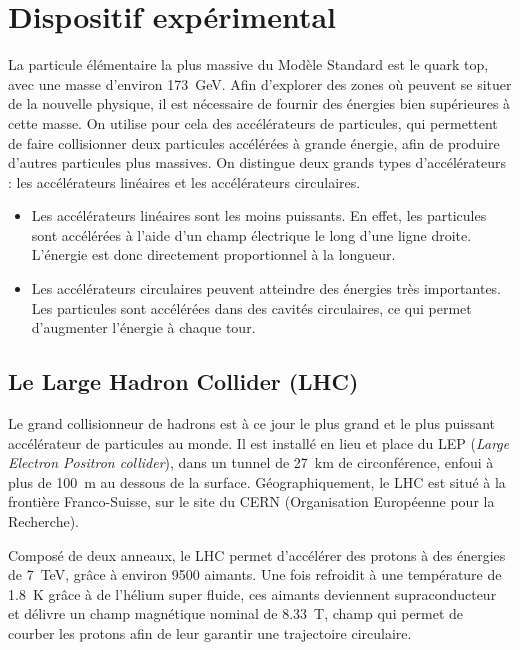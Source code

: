\chapter{Dispositif expérimental} \label{chap:detecteur}


La particule élémentaire la plus massive du Modèle Standard est le quark top, avec une masse d'environ \SI{173}{\GeV}. Afin d'explorer des zones où peuvent se situer de la nouvelle physique, il est nécessaire de fournir des énergies bien supérieures à cette masse. On utilise pour cela des accélérateurs de particules, qui permettent de faire collisionner deux particules accélérées à grande énergie, afin de produire d'autres particules plus massives. On distingue deux grands types d'accélérateurs : les accélérateurs linéaires et les accélérateurs circulaires.
\begin{itemize}
  \item Les accélérateurs linéaires sont les moins puissants. En effet, les particules sont accélérées à l'aide d'un champ électrique le long d'une ligne droite. L'énergie est donc directement proportionnel à la longueur.
  \item Les accélérateurs circulaires peuvent atteindre des énergies très importantes. Les particules sont accélérées dans des cavités circulaires, ce qui permet d'augmenter l'énergie à chaque tour. 
\end{itemize}

\section{Le Large Hadron Collider (LHC)}

Le grand collisionneur de hadrons est à ce jour le plus grand et le plus puissant accélérateur de particules au monde. Il est installé en lieu et place du LEP (\emph{Large Electron Positron collider}), dans un tunnel de \SI{27}{\km} de circonférence, enfoui à plus de \SI{100}{\m} au dessous de la surface. Géographiquement, le LHC est situé à la frontière Franco-Suisse, sur le site du CERN (Organisation Européenne pour la Recherche).

Composé de deux anneaux, le LHC permet d'accélérer des protons à des énergies de \SI{7}{\TeV}, grâce à environ 9500 aimants. Une fois refroidit à une température de \SI{1.8}{\K} grâce à de l'hélium super fluide, ces aimants deviennent supraconducteur et délivre un champ magnétique nominal de \SI{8.33}{\tesla}, champ qui permet de courber les protons afin de leur garantir une trajectoire circulaire.

